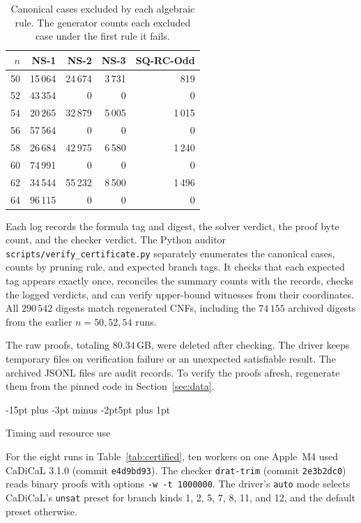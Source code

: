 \documentclass[11pt,a4paper]{article}
\makeatletter
\renewcommand{\subsection}{\@startsection{subsection}{2}{\z@}%
  {-15pt plus -3pt minus -2pt}{5pt plus 1pt}%
  {\normalfont\bfseries\raggedright}}
\theoremstyle{result}
\theoremstyle{definition}
\theoremstyle{remark}
\makeatother
\begin{document}
\begin{table}[!htbp]
\centering\small
\caption{Canonical cases excluded by each algebraic rule. The
  generator counts each excluded case under the first rule it fails.}
\label{tab:pruning}
\setlength{\tabcolsep}{10pt}
\renewcommand{\arraystretch}{1.12}
\begin{tabular}{@{}rrrrr@{}}
\toprule
$n$ & NS-1 & NS-2 & NS-3 & SQ-RC-Odd \\
\midrule
50 & 15\,064 & 24\,674 & 3\,731 & 819 \\
52 & 43\,354 & 0 & 0 & 0 \\
54 & 20\,265 & 32\,879 & 5\,005 & 1\,015 \\
56 & 57\,564 & 0 & 0 & 0 \\
58 & 26\,684 & 42\,975 & 6\,580 & 1\,240 \\
60 & 74\,991 & 0 & 0 & 0 \\
62 & 34\,544 & 55\,232 & 8\,500 & 1\,496 \\
64 & 96\,115 & 0 & 0 & 0 \\
\bottomrule
\end{tabular}
\end{table}

Each log records the formula tag and digest, the solver verdict,
the proof byte count, and the checker verdict. The Python auditor
\nolinkurl{scripts/verify_certificate.py} separately enumerates
the canonical cases, counts by pruning rule, and expected branch
tags. It checks that each expected tag appears exactly once,
reconciles the summary counts with the records, checks the logged
verdicts, and can verify upper-bound witnesses from their coordinates.
All $290\,542$ digests match regenerated CNFs, including the
$74\,155$ archived digests from the earlier $n=50,52,54$ runs.

The raw proofs, totaling $80.34$\,GB, were deleted after checking.
The driver keeps temporary files on verification failure or an
unexpected satisfiable result. The archived JSONL files are audit
records. To verify the proofs afresh, regenerate them from the
pinned code in Section~\ref{sec:data}.

\subsection{Timing and resource use}

For the eight runs in Table~\ref{tab:certified}, ten workers on
one Apple~M4 used CaDiCaL 3.1.0 (commit \texttt{e4d9bd93}).
The checker \texttt{drat-trim} (commit \texttt{2e3b2dc0}) reads
binary proofs with options \mbox{\texttt{-w -t 1000000}}.
The driver's \texttt{auto} mode selects CaDiCaL's \texttt{unsat}
preset for branch kinds 1, 2, 5, 7, 8, 11, and 12, and the default
preset otherwise.
\end{document}
